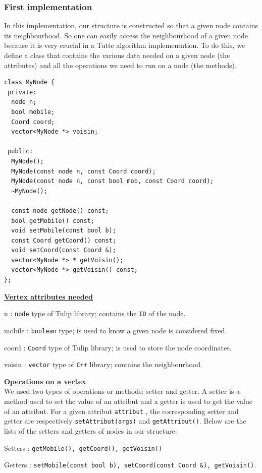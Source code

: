 \subsubsection{First implementation}
In this implementation, our structure is constructed so that a given node
contains its neighbourhood. So one can easily access the neighbourhood
of a given node because it is very crucial in a Tutte algorithm
implementation. To do this, we define a class that contains the various
data needed on a given node (the attributes) and all the operations we
need to run on a node (the methods).

\newpage
\begin{lstlisting}
class MyNode {
 private:
  node n;
  bool mobile;
  Coord coord;  
  vector<MyNode *> voisin;

 public:
  MyNode();
  MyNode(const node n, const Coord coord);
  MyNode(const node n, const bool mob, const Coord coord);
  ~MyNode();
  
  const node getNode() const;
  bool getMobile() const;
  void setMobile(const bool b);
  const Coord getCoord() const;
  void setCoord(const Coord &);
  vector<MyNode *> * getVoisin();
  vector<MyNode *> getVoisin() const;
};
\end{lstlisting}
\noindent
\underline{\bf Vertex attributes needed}
\begin{dinglist}{70}
\item[n]: \texttt{node} type of \textsf{Tulip} library; contains the \texttt{ID} of the node.  
\item[mobile]: \texttt{boolean} type; is used to know a given node is considered fixed.
\item[coord]: \texttt{Coord} type of \textsf{Tulip} library; is used to store the node coordinates. 
\item[voisin]: \texttt{vector} type of \texttt{C++} library; contains the neighbourhood.
\end{dinglist}
\noindent
\underline{\bf Operations on a vertex}~\\
We used two types of operations or methods: \textsf{setter} and
\textsf{getter}. A \textsf{setter} is a method used to set the value of an
attribut and a \textsf{getter} is used to get the value of an attribut. For
a given attribut \texttt{attribut} , the corresponding setter and getter
are respectively \verb+setAttribut(args)+ and \verb+getAttribut()+. Below
are the lists of the setters and getters of nodes in our structure:
\begin{dinglist}{70}
\item[Setters]: \verb+getMobile(), getCoord(), getVoisin()+  
\item[Getters]: \verb+setMobile(const bool b), setCoord(const Coord &), getVoisin()+.
\end{dinglist}

